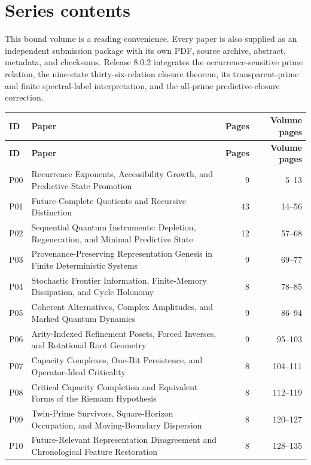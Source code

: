\documentclass[11pt,a4paper]{article}
\begin{document}
\MakeResearchTitle
\section*{Series contents}
This bound volume is a reading convenience. Every paper is also supplied as an independent submission package with its own PDF, source archive, abstract, metadata, and checksums. Release 8.0.2 integrates the occurrence-sensitive prime relation, the nine-state thirty-six-relation closure theorem, its transparent-prime and finite spectral-label interpretation, and the all-prime predictive-closure correction.
\begin{longtable}{@{}p{}p{}r r@{}}
\toprule
\textbf{ID} & \textbf{Paper} & \textbf{Pages} & \textbf{Volume pages}\\
\midrule
\endfirsthead
\toprule
\textbf{ID} & \textbf{Paper} & \textbf{Pages} & \textbf{Volume pages}\\
\midrule
\endhead
P00 & Recurrence Exponents, Accessibility Growth, and Predictive-State Promotion & 9 & 5--13 \\ \midrule
P01 & Future-Complete Quotients and Recursive Distinction & 43 & 14--56 \\ \midrule
P02 & Sequential Quantum Instruments: Depletion, Regeneration, and Minimal Predictive State & 12 & 57--68 \\ \midrule
P03 & Provenance-Preserving Representation Genesis in Finite Deterministic Systems & 9 & 69--77 \\ \midrule
P04 & Stochastic Frontier Information, Finite-Memory Dissipation, and Cycle Holonomy & 8 & 78--85 \\ \midrule
P05 & Coherent Alternatives, Complex Amplitudes, and Marked Quantum Dynamics & 9 & 86--94 \\ \midrule
P06 & Arity-Indexed Refinement Posets, Forced Inverses, and Rotational Root Geometry & 9 & 95--103 \\ \midrule
P07 & Capacity Complexes, One-Bit Persistence, and Operator-Ideal Criticality & 8 & 104--111 \\ \midrule
P08 & Critical Capacity Completion and Equivalent Forms of the Riemann Hypothesis & 8 & 112--119 \\ \midrule
P09 & Twin-Prime Survivors, Square-Horizon Occupation, and Moving-Boundary Dispersion & 8 & 120--127 \\ \midrule
P10 & Future-Relevant Representation Disagreement and Chronological Feature Restoration & 8 & 128--135 \\ \midrule

\end{longtable}
\end{document}
